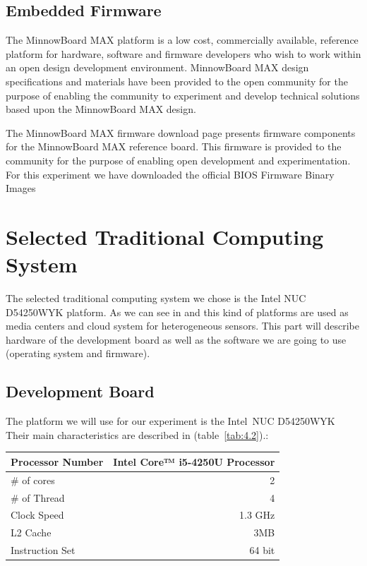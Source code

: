 \subsection{Embedded Firmware}

The  MinnowBoard MAX  platform is a low cost, commercially available, reference
platform for hardware, software and firmware developers who wish to work within
an open design development environment.  MinnowBoard MAX design specifications
and materials have been provided to the open community for the purpose of
enabling the community to experiment and develop technical solutions based upon
the  MinnowBoard MAX design.

The  MinnowBoard MAX firmware download page presents firmware components for the
 MinnowBoard MAX reference board. This firmware is provided to the community for
the purpose of enabling open development and experimentation. For this
experiment we have downloaded the official BIOS Firmware Binary Images
\cite{minnowmax-firmware}

\section{Selected Traditional Computing System}
\noindent

The selected traditional computing system we chose is the Intel NUC D54250WYK
platform. As we can see in \cite{Bo} and \cite{Shen} this kind of platforms are
used as media centers and cloud system for heterogeneous sensors. This part
will describe hardware of the development board as well as the software we are
going to use (operating system and firmware).

\subsection{Development Board} 

The platform we will use for our experiment is the
Intel\textregistered\ NUC D54250WYK Their main characteristics are
described in (table~\ref{tab:4.2}).\cite{NUC}:

    \begin{center}
    \begin{tabular}{ | l | r |}
        \hline
        Processor Number & Intel Core™ i5-4250U Processor \\ \hline
        \# of cores &  2 \\ \hline
        \# of Thread & 4  \\ \hline
        Clock Speed & 1.3 GHz  \\ \hline
        L2 Cache & 3MB  \\ \hline
        Instruction Set & 64 bit  \\ \hline
    \end{tabular}
     \label{tab:4.2}
    \end{center}


